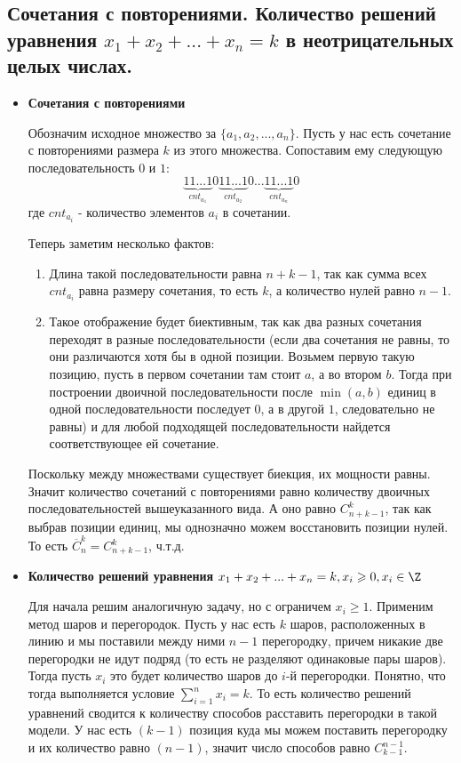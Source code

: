 \subsection{Сочетания с повторениями. Количество решений уравнения $x_1 + x_2 + ... + x_n = k$ в неотрицательных целых числах.}

\begin{itemize}
	\item \textbf{Сочетания с повторениями}
	
	Обозначим исходное множество за $\{a_1, a_2, ..., a_n\}$. Пусть у нас есть сочетание с повторениями размера $k$ из этого множества. Сопоставим ему следующую последовательность $0$ и $1$:
	$$\underbrace{11...1}_{cnt_{a_1}}0\underbrace{11...1}_{cnt_{a_2}}0...\underbrace{11...1}_{cnt_{a_n}}0$$
	где $cnt_{a_i}$ - количество элементов $a_i$ в сочетании.
	
	Теперь заметим несколько фактов:
	\begin{enumerate}
		\item Длина такой последовательности равна $n + k - 1$, так как сумма всех $cnt_{a_i}$ равна размеру сочетания, то есть $k$, а количество нулей равно $n - 1$.
		\item Такое отображение будет биективным, так как два разных сочетания переходят в разные последовательности (если два сочетания не равны, то они различаются хотя бы в одной позиции. Возьмем первую такую позицию, пусть в первом сочетании там стоит $a$, а во втором $b$. Тогда при построении двоичной последовательности после $\min{(a, b)}$ единиц в одной последовательности последует $0$, а в другой $1$, следовательно не равны) и для любой подходящей последовательности найдется соответствующее ей сочетание.
	\end{enumerate}

	Поскольку между множествами существует биекция, их мощности равны. Значит количество сочетаний с повторениями равно количеству двоичных последовательностей вышеуказанного вида. А оно равно $C^k_{n+k-1}$, так как выбрав позиции единиц, мы однозначно можем восстановить позиции нулей. То есть $\overline C^k_n = C^k_{n+k-1}$, ч.т.д.
	
	\item \textbf{Количество решений уравнения $x_1 + x_2 + ... + x_n = k, x_i \geqslant 0, x_i \in \Z$}
	
	Для начала решим аналогичную задачу, но с ограничем $x_i \geqslant 1$. Применим метод шаров и перегородок. Пусть у нас есть $k$ шаров, расположенных в линию и мы поставили между ними $n - 1$ перегородку, причем никакие две перегородки не идут подряд (то есть не разделяют одинаковые пары шаров). Тогда пусть $x_i$ это будет количество шаров до $i$-й перегородки. Понятно, что тогда выполняется условие $\sum_{i=1}^{n}x_i = k$. То есть количество решений уравнений сводится к количеству способов расставить перегородки в такой модели. У нас есть $(k - 1)$ позиция куда мы можем поставить перегородку и их количество равно $(n - 1)$, значит число способов равно $C^{n-1}_{k-1}$.
	

\end{itemize}
